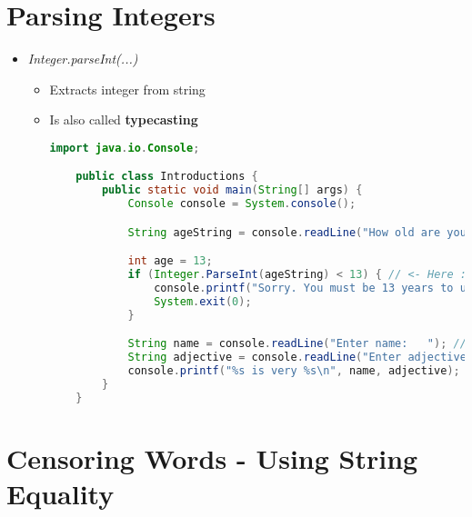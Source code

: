 \documentclass[12pt]{article}
\begin{document}
\section{Parsing Integers}

\bigskip

\begin{itemize}
    \item \textit{Integer.parseInt(...)}
    \begin{itemize}
        \item Extracts integer from string
        \item Is also called \textbf{typecasting}

    \begin{lstlisting}[language=Java]
    import java.io.Console;

    public class Introductions {
        public static void main(String[] args) {
            Console console = System.console();

            String ageString = console.readLine("How old are you?  ");

            int age = 13;
            if (Integer.ParseInt(ageString) < 13) { // <- Here :)
                console.printf("Sorry. You must be 13 years to use this program");
                System.exit(0);
            }

            String name = console.readLine("Enter name:   "); // <- Let's write 'Moe' here
            String adjective = console.readLine("Enter adjective:   "); // <- and 'glad to be with his love' here :)
            console.printf("%s is very %s\n", name, adjective);
        }
    }
    \end{lstlisting}
    \end{itemize}
\end{itemize}

\section{Censoring Words - Using String Equality}

\bigskip
\end{document}
